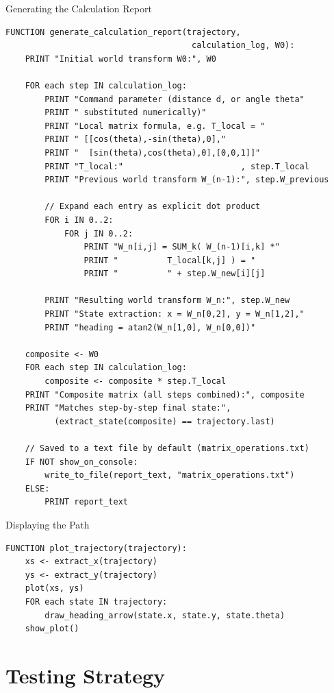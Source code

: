 \documentclass[12pt]{report}
\begin{document}
\begin{pseudobox}{Generating the Calculation Report}
\begin{verbatim}
FUNCTION generate_calculation_report(trajectory,
                                      calculation_log, W0):
    PRINT "Initial world transform W0:", W0

    FOR each step IN calculation_log:
        PRINT "Command parameter (distance d, or angle theta"
        PRINT " substituted numerically)"
        PRINT "Local matrix formula, e.g. T_local = "
        PRINT " [[cos(theta),-sin(theta),0],"
        PRINT "  [sin(theta),cos(theta),0],[0,0,1]]"
        PRINT "T_local:"                        , step.T_local
        PRINT "Previous world transform W_(n-1):", step.W_previous

        // Expand each entry as explicit dot product
        FOR i IN 0..2:
            FOR j IN 0..2:
                PRINT "W_n[i,j] = SUM_k( W_(n-1)[i,k] *"
                PRINT "          T_local[k,j] ) = "
                PRINT "          " + step.W_new[i][j]

        PRINT "Resulting world transform W_n:", step.W_new
        PRINT "State extraction: x = W_n[0,2], y = W_n[1,2],"
        PRINT "heading = atan2(W_n[1,0], W_n[0,0])"

    composite <- W0
    FOR each step IN calculation_log:
        composite <- composite * step.T_local
    PRINT "Composite matrix (all steps combined):", composite
    PRINT "Matches step-by-step final state:",
          (extract_state(composite) == trajectory.last)

    // Saved to a text file by default (matrix_operations.txt)
    IF NOT show_on_console:
        write_to_file(report_text, "matrix_operations.txt")
    ELSE:
        PRINT report_text
\end{verbatim}
\end{pseudobox}

\begin{pseudobox}{Displaying the Path}
\begin{verbatim}
FUNCTION plot_trajectory(trajectory):
    xs <- extract_x(trajectory)
    ys <- extract_y(trajectory)
    plot(xs, ys)
    FOR each state IN trajectory:
        draw_heading_arrow(state.x, state.y, state.theta)
    show_plot()
\end{verbatim}
\end{pseudobox}

\chapter{Testing Strategy}
\enlargethispage{2\baselineskip}
\end{document}
